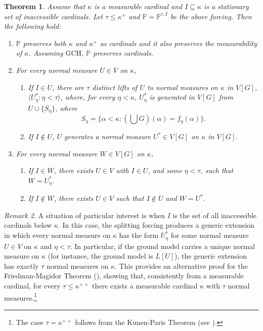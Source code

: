 \documentclass[11pt]{amsart}
\newtheorem{theorem}{Theorem}[section]
\theoremstyle{definition}
\theoremstyle{remark}
\newtheorem{remark}[theorem]{Remark}
\newcommand\<{{<}}
\newcommand{\po}{\mathbb{P}}
\newcommand{\la}{\langle}
\newcommand{\ra}{\rangle}
\begin{document}
\begin{theorem}
\label{thm: properties of the splitting forcing}
    Assume that $\kappa$ is a measurable cardinal and $I\subseteq \kappa$ is a stationary set of inaccessible cardinals. Let $\tau\leq \kappa^+$ and $\po = \po^{\tau, I}$ be the above forcing. %
    Then the following hold:
    \begin{enumerate}
        \item $\po$ preserves both $\kappa$ and $ \kappa^+$ as  cardinals and it also preserves the measurability of $\kappa$.  Assuming $\mathrm{GCH}$, $\po$ preserves cardinals.
        \item \label{Clause: splitting forcing lifting measures} For every normal measure $U\in V$ on $\kappa$,
        \begin{enumerate}
            \item If $I\in U$, there are $\tau$ distinct lifts of $U$ to normal measures on $\kappa$ in $V[G]$, $\la U^*_\eta \colon \eta<\tau \ra$, where, for every $\eta<\kappa$, $U^*_\eta$ is generated in $V[G]$ from $U\cup \{S_\eta\}$, where 
        $$S_\eta = \{ \alpha<\kappa \colon \left(\bigcup G\right)(\alpha) = f_\eta(\alpha) \}. $$
            \item If $I\notin U$, $U$ generates a normal measure $U^*\in V[G]$ on $\kappa$ in $V[G]$.
        \end{enumerate}
        \item For every normal measure $W\in V[G]$ on $\kappa$,
        \begin{enumerate}
            \item If $I\in W$, there exists $U\in V$ with $I\in U$, and some $\eta<\tau$, such that $W = U^*_\eta$. 
            \item If $I\notin W$, there exists $U\in V$ such that $I\notin U$ and $W = U^*$.
        \end{enumerate}
    \end{enumerate}
\end{theorem}

\begin{remark}
    A situation of particular interest is when $I$ is the set of all inaccessible cardinals below $\kappa$. In this case, the splitting forcing produces a generic extension in which every normal measure on $\kappa$ has the form $U^*_\eta$ for some normal measure $U\in V$ on $\kappa$ and $\eta<\tau$. In particular, if the ground model carries a unique normal measure on $\kappa$ (for instance, the ground model is $L[U]$), the generic extension has exactly $\tau$ normal measures on $\kappa$. This provides an alternative proof for the Friedman-Magidor Theorem (\cite{FriedmanMagidor}), showing that, consistently from a measurable cardinal, for every $\tau\leq \kappa^{++}$ there exists a measurable cardinal $\kappa$ with $\tau$ normal measures.\footnote{The case $\tau = \kappa^{++}$ follows from the Kunen-Paris Theorem (see \cite{KunenParis}).}
\end{remark}
\end{document}
